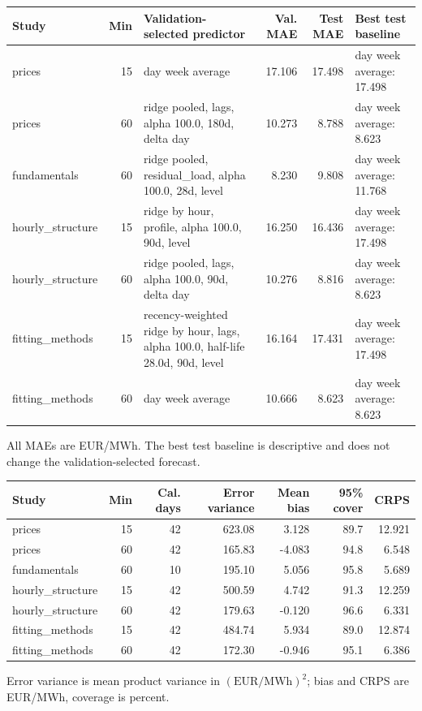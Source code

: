 \documentclass[11pt,a4paper]{article}
\begin{document}
{\scriptsize\begin{longtable}{p{}rp{}rrp{}}
\toprule Study & Min & Validation-selected predictor & Val. MAE & Test MAE & Best test baseline \\ \midrule
\endhead
prices & 15 & day week average & 17.106 & 17.498 & day week average: 17.498 \\
prices & 60 & ridge pooled, lags, alpha 100.0, 180d, delta day & 10.273 & 8.788 & day week average: 8.623 \\
fundamentals & 60 & ridge pooled, residual\_load, alpha 100.0, 28d, level & 8.230 & 9.808 & day week average: 11.768 \\
hourly\_structure & 15 & ridge by hour, profile, alpha 100.0, 90d, level & 16.250 & 16.436 & day week average: 17.498 \\
hourly\_structure & 60 & ridge pooled, lags, alpha 100.0, 90d, delta day & 10.276 & 8.816 & day week average: 8.623 \\
fitting\_methods & 15 & recency-weighted ridge by hour, lags, alpha 100.0, half-life 28.0d, 90d, level & 16.164 & 17.431 & day week average: 17.498 \\
fitting\_methods & 60 & day week average & 10.666 & 8.623 & day week average: 8.623 \\
\bottomrule\end{longtable}}
All MAEs are EUR/MWh. The best test baseline is descriptive and does not change the validation-selected forecast.

{\scriptsize\begin{longtable}{p{}rrrrrr}
\toprule Study & Min & Cal. days & Error variance & Mean bias & 95\% cover & CRPS \\ \midrule
\endhead
prices & 15 & 42 & 623.08 & 3.128 & 89.7 & 12.921 \\
prices & 60 & 42 & 165.83 & -4.083 & 94.8 & 6.548 \\
fundamentals & 60 & 10 & 195.10 & 5.056 & 95.8 & 5.689 \\
hourly\_structure & 15 & 42 & 500.59 & 4.742 & 91.3 & 12.259 \\
hourly\_structure & 60 & 42 & 179.63 & -0.120 & 96.6 & 6.331 \\
fitting\_methods & 15 & 42 & 484.74 & 5.934 & 89.0 & 12.874 \\
fitting\_methods & 60 & 42 & 172.30 & -0.946 & 95.1 & 6.386 \\
\bottomrule\end{longtable}}
Error variance is mean product variance in $(\mathrm{EUR/MWh})^2$; bias and CRPS are EUR/MWh, coverage is percent.
\end{document}
